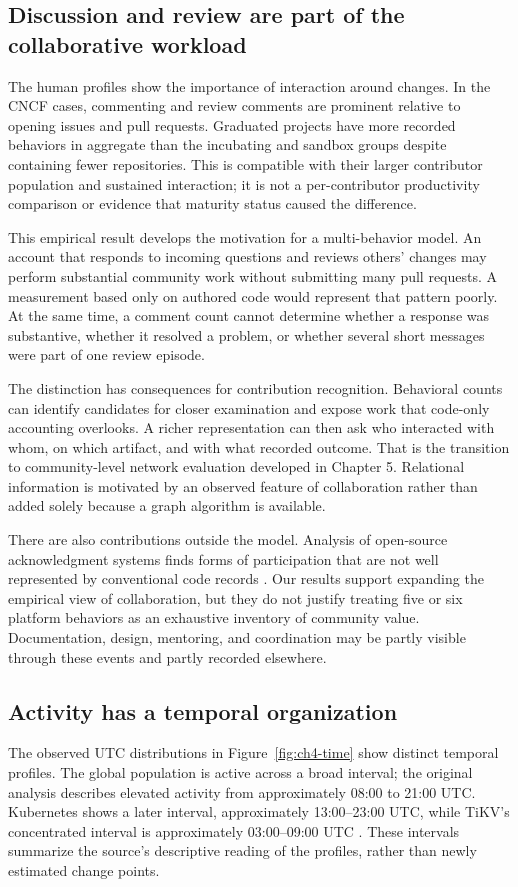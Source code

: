\subsection{Discussion and review are part of the collaborative workload}
The human profiles show the importance of interaction around changes. In the CNCF cases, commenting and review comments are prominent relative to opening issues and pull requests. Graduated projects have more recorded behaviors in aggregate than the incubating and sandbox groups despite containing fewer repositories. This is compatible with their larger contributor population and sustained interaction; it is not a per-contributor productivity comparison or evidence that maturity status caused the difference.

This empirical result develops the motivation for a multi-behavior model. An account that responds to incoming questions and reviews others' changes may perform substantial community work without submitting many pull requests. A measurement based only on authored code would represent that pattern poorly. At the same time, a comment count cannot determine whether a response was substantive, whether it resolved a problem, or whether several short messages were part of one review episode.

The distinction has consequences for contribution recognition. Behavioral counts can identify candidates for closer examination and expose work that code-only accounting overlooks. A richer representation can then ask who interacted with whom, on which artifact, and with what recorded outcome. That is the transition to community-level network evaluation developed in Chapter 5. Relational information is motivated by an observed feature of collaboration rather than added solely because a graph algorithm is available.

There are also contributions outside the model. Analysis of open-source acknowledgment systems finds forms of participation that are not well represented by conventional code records \citep{young2021}. Our results support expanding the empirical view of collaboration, but they do not justify treating five or six platform behaviors as an exhaustive inventory of community value. Documentation, design, mentoring, and coordination may be partly visible through these events and partly recorded elsewhere.

\subsection{Activity has a temporal organization}
The observed UTC distributions in Figure~\ref{fig:ch4-time} show distinct temporal profiles. The global population is active across a broad interval; the original analysis describes elevated activity from approximately 08:00 to 21:00 UTC. Kubernetes shows a later interval, approximately 13:00--23:00 UTC, while TiKV's concentrated interval is approximately 03:00--09:00 UTC \citep[Section V.C]{xia2022}. These intervals summarize the source's descriptive reading of the profiles, rather than newly estimated change points.


